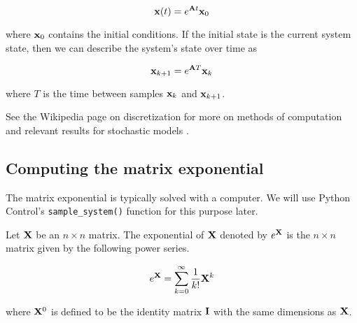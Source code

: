 \begin{equation*}
  \mathbf{x}(t) = e^{\mathbf{A}t} \mathbf{x}_0
\end{equation*}

where $\mathbf{x}_0$ contains the initial conditions. If the initial state is the
current system state, then we can describe the system's state over time as

\begin{equation*}
  \mathbf{x}_{k+1} = e^{\mathbf{A}T} \mathbf{x}_k
\end{equation*}

where $T$ is the time between samples $\mathbf{x}_k$ and $\mathbf{x}_{k+1}$.

See the Wikipedia page on discretization for more on methods of computation and
relevant results for stochastic models \cite{bib:discretization}.

\subsection{Computing the matrix exponential}

The matrix exponential is typically solved with a computer. We will use Python
Control's \texttt{sample\_system()} function for this purpose later.

\begin{definition}
  Let $\mathbf{X}$ be an $n \times n$ matrix. The exponential of $\mathbf{X}$ denoted
  by $e^{\mathbf{X}}$ is the $n \times n$ matrix given by the following power
  series.

  \begin{equation}
    e^{\mathbf{X}} = \sum_{k=0}^\infty \frac{1}{k!} \mathbf{X}^k
  \end{equation}

  where $\mathbf{X}^0$ is defined to be the identity matrix $\mathbf{I}$ with the same
  dimensions as $\mathbf{X}$.
\end{definition}
